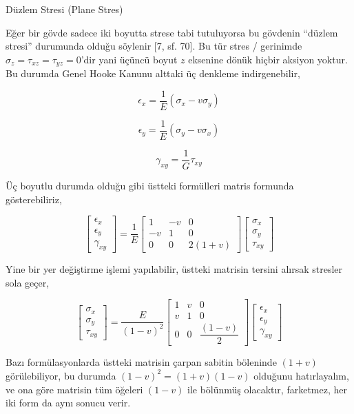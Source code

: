 \documentclass[12pt,fleqn]{article}\usepackage{../../common}
\begin{document}
Düzlem Stresi (Plane Stres)

Eğer bir gövde sadece iki boyutta strese tabi tutuluyorsa bu gövdenin ``düzlem
stresi'' durumunda olduğu söylenir [7, sf. 70]. Bu tür stres / gerinimde
$\sigma_z = \tau_{xz} = \tau_{yz} = 0$'dir yani üçüncü boyut $z$ eksenine dönük
hiçbir aksiyon yoktur. Bu durumda Genel Hooke Kanunu alttaki üç denkleme
indirgenebilir,

$$
\epsilon_x = \frac{1}{E} (\sigma_x - v \sigma_y )
$$

$$
\epsilon_y = \frac{1}{E} (\sigma_y - v \sigma_x )
$$

$$
\gamma_{xy} = \frac{1}{G} \tau_{xy}
$$

Üç boyutlu durumda olduğu gibi üstteki formülleri matris formunda
gösterebiliriz,

$$
\left[\begin{array}{c}
\epsilon_{x} \\ \epsilon_{y} \\ \gamma_{xy}
\end{array}\right] =
\frac{1}{E}
\left[\begin{array}{ccc}
1 & -v & 0 \\
-v & 1 & 0 \\
0 & 0 & 2(1+v)
\end{array}\right]
\left[\begin{array}{c}
\sigma_x \\ \sigma_y \\ \tau_{xy}
\end{array}\right]
$$

Yine bir yer değiştirme işlemi yapılabilir, üstteki matrisin tersini alırsak
stresler sola geçer, 

$$
\left[\begin{array}{c}
\sigma_x \\ \sigma_y \\ \tau_{xy}
\end{array}\right] = 
\frac{E}{(1-v)^2}
\left[\begin{array}{ccc}
1 & v & 0 \\ v & 1 & 0 \\ 0 & 0 & \dfrac{(1-v)}{2}
\end{array}\right]
\left[\begin{array}{c}
\epsilon_{x} \\ \epsilon_{y} \\ \gamma_{xy}
\end{array}\right] 
$$

Bazı formülasyonlarda üstteki matrisin çarpan sabitin böleninde $(1+v)$
görülebiliyor, bu durumda $(1-v)^2=(1+v)(1-v)$ olduğunu hatırlayalım, ve ona
göre matrisin tüm öğeleri $(1-v)$ ile bölünmüş olacaktır, farketmez, her iki
form da aynı sonucu verir.
\end{document}
